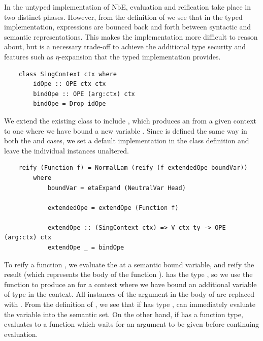 In the untyped implementation of NbE, evaluation and reification take place in two distinct phases. However, from the definition of  we see that in the typed implementation, expressions are bounced back and forth between syntactic and semantic representations. This makes the implementation more difficult to reason about, but is a necessary trade-off to achieve the additional type security and features such as $\eta$-expansion that the typed implementation provides.

\begin{lstlisting}
    class SingContext ctx where
        idOpe :: OPE ctx ctx
        bindOpe :: OPE (arg:ctx) ctx
        bindOpe = Drop idOpe
\end{lstlisting}

We extend the existing class  to include , which produces an  from a given context  to one where we have bound a new variable . Since  is defined the same way in both the  and \code{(:)} cases, we set a default implementation in the class definition and leave the individual instances unaltered. 

\begin{lstlisting}
    reify (Function f) = NormalLam (reify (f extendedOpe boundVar)) 
        where
            boundVar = etaExpand (NeutralVar Head)

            extendedOpe = extendOpe (Function f)

            extendOpe :: (SingContext ctx) => V ctx ty -> OPE (arg:ctx) ctx
            extendOpe _ = bindOpe 
\end{lstlisting}

To reify a function , we evaluate the  at a semantic bound variable, and reify the result (which represents the body of the function ).  has the type , so we use the  function to produce an  for a context where we have bound an additional variable of type  in the context. All instances of the argument in the body of  are replaced with . From the definition of , we see that if  has type ,  can immediately evaluate the variable into the semantic set. On the other hand, if  has a function type,  evaluates to a function which waits for an argument to be given before continuing evaluation.

